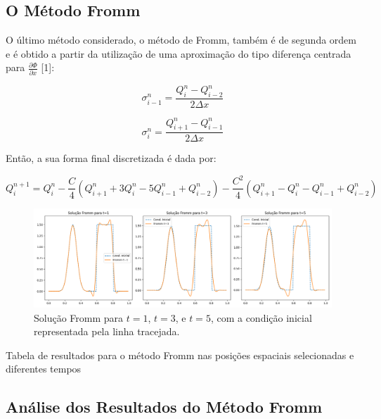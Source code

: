 \subsection{O Método Fromm}

O último método considerado, o método de Fromm, também é de segunda ordem e é obtido a partir da utilização de uma aproximação do tipo diferença centrada para $\frac{\partial \Phi}{\partial x}$ [1]:

\begin{equation}
\sigma_{i-1}^n = \frac{Q_i^n - Q_{i-2}^n}{2 \Delta x}
\end{equation}

\begin{equation}
\sigma_{i}^n = \frac{Q_{i+1}^n - Q_{i-1}^n}{2 \Delta x}
\end{equation}

Então, a sua forma final discretizada é dada por:

\begin{equation}
Q_i^{n+1} = Q_i^n - \frac{C}{4} (Q_{i+1}^n + 3 Q_i^n - 5 Q_{i-1}^n + Q_{i-2}^n) - \frac{C^2}{4} (Q_{i+1}^n - Q_i^n - Q_{i-1}^n + Q_{i-2}^n)
\end{equation}

\begin{figure}[H]
    \centering
    \includegraphics[width=\textwidth]{code/images/Fromm.png}
    \caption{Solução Fromm para $t=1$, $t=3$, e $t=5$, com a condição inicial representada pela linha tracejada.}
\end{figure}

\begin{table}[H]
    \centering
    
    \caption{Tabela de resultados para o método Fromm nas posições espaciais selecionadas e diferentes tempos}
    \label{tab:fromm}
\end{table}

\subsection{Análise dos Resultados do Método Fromm}

